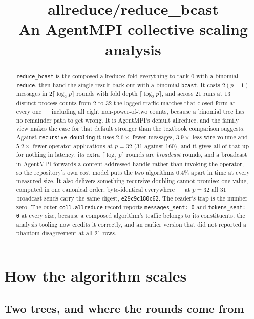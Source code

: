 \documentclass[11pt]{article}
\title{\textbf{allreduce/reduce\_bcast}\\[2pt]\large An AgentMPI collective scaling analysis}
\author{}
\date{}
\begin{document}
\maketitle

\begin{abstract}
\texttt{reduce\_bcast} is the composed allreduce: fold everything to rank 0 with a binomial
\texttt{reduce}, then hand the single result back out with a binomial \texttt{bcast}. It costs
$2(p-1)$ messages in $2\lceil\log_2 p\rceil$ rounds with fold depth $\lceil\log_2 p\rceil$, and
across 21 runs at 13 distinct process counts from 2 to 32 the logged traffic matches that closed
form at every one --- including all eight non-power-of-two counts, because a binomial tree has no
remainder path to
get wrong. It is AgentMPI's default allreduce, and the family view makes the case for that
default stronger than the textbook comparison suggests. Against
\texttt{recursive\_doubling} it uses $2.6\times$ fewer messages, $3.9\times$ less wire volume and
$5.2\times$ fewer operator applications at $p=32$ (31 against 160), and it gives all of that up
for nothing in latency: its extra $\lceil\log_2 p\rceil$ rounds are \emph{broadcast} rounds, and
a broadcast in AgentMPI forwards a content-addressed handle rather than invoking the operator, so
the repository's own cost model puts the two algorithms 0.4\% apart in time at every measured
size. It also delivers something recursive doubling cannot promise: one value, computed in one
canonical order, byte-identical everywhere --- at $p=32$ all 31 broadcast sends carry the same
digest, \texttt{e29c9c180c62}. The reader's trap is the number zero. The outer
\texttt{coll.allreduce} record reports \texttt{messages\_sent: 0} and \texttt{tokens\_sent: 0} at
every size, because a composed algorithm's traffic belongs to its constituents; the analysis
tooling now credits it correctly, and an earlier version that did not reported a phantom
disagreement at all 21 rows.
\end{abstract}



\section{How the algorithm scales}

\subsection{Two trees, and where the rounds come from}
\end{document}
